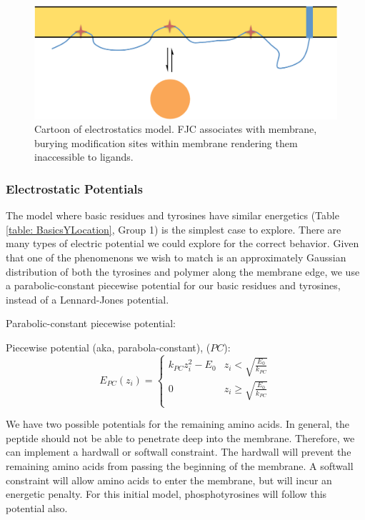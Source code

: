 \documentclass[../../AdvancementSummary.tex]{subfiles}
\begin{document}
\begin{figure}[H]
\begin{center}
    \includegraphics[width=0.7\linewidth]{ElectrostaticsDiagram.pdf}
    \caption{Cartoon of electrostatics model. FJC associates with membrane, burying modification sites within membrane rendering them inaccessible to ligands.\label{fig: ElectrostaticsCartoon}}
    \end{center}
\end{figure}


\subsubsection{Electrostatic Potentials}

The model where basic residues and tyrosines have similar energetics (Table \ref{table: BasicsYLocation}, Group 1) is the simplest case to explore. There are many types of electric potential we could explore for the correct behavior.  Given that one of the phenomenons we wish to match is an approximately Gaussian distribution of both the tyrosines and polymer along the membrane edge, we use a parabolic-constant piecewise potential for our basic residues and tyrosines, instead of a Lennard-Jones potential. 

Parabolic-constant piecewise potential:

Piecewise potential (aka, parabola-constant), ($PC$):
\begin{equation}\label{eq: parabolaconstant}
E_{PC}(z_i) = 
\begin{cases}
k_{PC}z_i^2-E_0 	& z_i<\sqrt{\frac{E_0}{k_{PC}}}\\
0 & z_i \geq \sqrt{\frac{E_0}{k_{PC}}} \\
\end{cases}
\end{equation}

We have two possible potentials for the remaining amino acids.  In general, the peptide should not be able to penetrate deep into the membrane. Therefore, we can implement a hardwall or softwall constraint. The hardwall will prevent the remaining amino acids from passing the beginning of the membrane. A softwall constraint will allow amino acids to enter the membrane, but will incur an energetic penalty. For this initial model, phosphotyrosines will follow this potential also.
\end{document}

